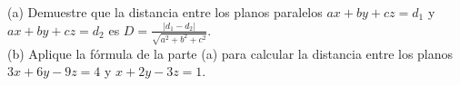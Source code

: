 \item (a) Demuestre que la distancia entre los planos paralelos $ax + by + cz = d_1$ y $ax + by + cz = d_2$ es $D = \frac{|d_1 - d_2|}{\sqrt{a^2 + b^2 + c^2}}$. \\
    (b) Aplique la fórmula de la parte (a) para calcular la distancia entre los planos $3x + 6y - 9z = 4$ y $x + 2y - 3z = 1$.
